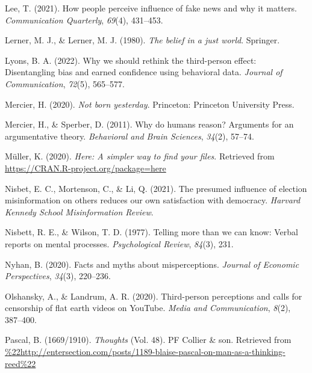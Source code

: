 \documentclass[
  ,jou,floatsintext]{apa6}
\newlength{\cslhangindent}
\newlength{\cslentryspacingunit} %
\newenvironment{CSLReferences}[2] %
 {%
  \setlength{\parindent}{0pt}
  \ifodd #1
  \let\oldpar\par
  \def\par{\hangindent=\cslhangindent\oldpar}
  \fi
  \setlength{\parskip}{#2\cslentryspacingunit}
 }%
 {}
\begin{document}
\begin{CSLReferences}{1}{0}
\leavevmode{}%
Lee, T. (2021). How people perceive influence of fake news and why it matters. \emph{Communication Quarterly}, \emph{69}(4), 431--453.

\leavevmode{}%
Lerner, M. J., \& Lerner, M. J. (1980). \emph{The belief in a just world}. Springer.

\leavevmode{}%
Lyons, B. A. (2022). Why we should rethink the third-person effect: Disentangling bias and earned confidence using behavioral data. \emph{Journal of Communication}, \emph{72}(5), 565--577.

\leavevmode{}%
Mercier, H. (2020). \emph{Not born yesterday}. Princeton: Princeton University Press.

\leavevmode{}%
Mercier, H., \& Sperber, D. (2011). Why do humans reason? Arguments for an argumentative theory. \emph{Behavioral and Brain Sciences}, \emph{34}(2), 57--74.

\leavevmode{}%
Müller, K. (2020). \emph{Here: A simpler way to find your files}. Retrieved from \url{https://CRAN.R-project.org/package=here}

\leavevmode{}%
Nisbet, E. C., Mortenson, C., \& Li, Q. (2021). The presumed influence of election misinformation on others reduces our own satisfaction with democracy. \emph{Harvard Kennedy School Misinformation Review}.

\leavevmode{}%
Nisbett, R. E., \& Wilson, T. D. (1977). Telling more than we can know: Verbal reports on mental processes. \emph{Psychological Review}, \emph{84}(3), 231.

\leavevmode{}%
Nyhan, B. (2020). Facts and myths about misperceptions. \emph{Journal of Economic Perspectives}, \emph{34}(3), 220--236.

\leavevmode{}%
Olshansky, A., \& Landrum, A. R. (2020). Third-person perceptions and calls for censorship of flat earth videos on YouTube. \emph{Media and Communication}, \emph{8}(2), 387--400.

\leavevmode{}%
Pascal, B. (1669/1910). \emph{Thoughts} (Vol. 48). PF Collier \& son. Retrieved from \url{\%22http://entersection.com/posts/1189-blaise-pascal-on-man-as-a-thinking-reed\%22}


\end{CSLReferences}
\end{document}
